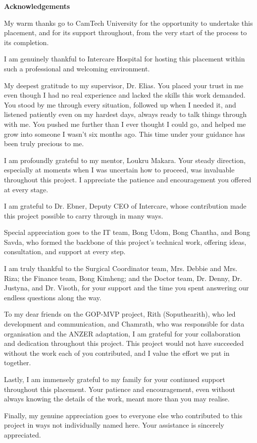 
\newpage
\thispagestyle{empty}

 \begin{center}
     {\huge \textbf{Acknowledgements}} \\[1.5cm]
 \end{center}

My warm thanks go to CamTech University for the opportunity to undertake this placement, and for its support throughout, from the very start of the process to its completion.

I am genuinely thankful to Intercare Hospital for hosting this placement within such a professional and welcoming environment.

My deepest gratitude to my supervisor, Dr. Elias. You placed your trust in me even though I had no real experience and lacked the skills this work demanded. You stood by me through every situation, followed up when I needed it, and listened patiently even on my hardest days, always ready to talk things through with me. You pushed me further than I ever thought I could go, and helped me grow into someone I wasn't six months ago. This time under your guidance has been truly precious to me.

I am profoundly grateful to my mentor, Loukru Makara. Your steady direction, especially at moments when I was uncertain how to proceed, was invaluable throughout this project. I appreciate the patience and encouragement you offered at every stage.

I am grateful to Dr. Ebner, Deputy CEO of Intercare, whose contribution made this project possible to carry through in many ways.

Special appreciation goes to the IT team, Bong Udom, Bong Chantha, and Bong Savda, who formed the backbone of this project's technical work, offering ideas, consultation, and support at every step.

I am truly thankful to the Surgical Coordinator team, Mrs. Debbie and Mrs. Riza; the Finance team, Bong Kimheng; and the Doctor team, Dr. Denny, Dr. Justyna, and Dr. Visoth, for your support and the time you spent answering our endless questions along the way.

To my dear friends on the GOP-MVP project, Rith (Soputhearith), who led development and communication, and Chamrath, who was responsible for data organisation and the ANZER adaptation, I am grateful for your collaboration and dedication throughout this project. This project would not have succeeded without the work each of you contributed, and I value the effort we put in together.

Lastly, I am immensely grateful to my family for your continued support throughout this placement. Your patience and encouragement, even without always knowing the details of the work, meant more than you may realise.

Finally, my genuine appreciation goes to everyone else who contributed to this project in ways not individually named here. Your assistance is sincerely appreciated.
